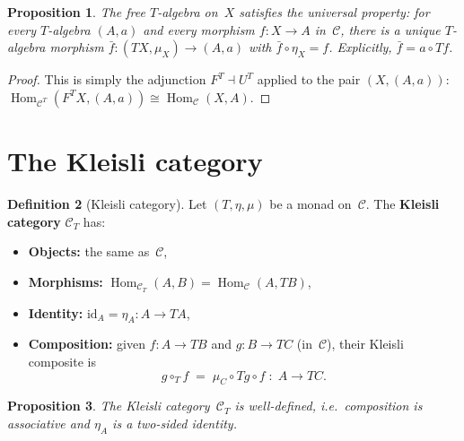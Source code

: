 \documentclass[a4paper,12pt]{book}
\DeclareMathOperator{\Hom}{Hom}
\newcommand{\id}{\mathrm{id}}
\theoremstyle{definition}
\newtheorem{definition}{Definition}[section]
\theoremstyle{plain}
\newtheorem{proposition}[definition]{Proposition}
\theoremstyle{remark}
\begin{document}
\begin{proposition}\label{prop:free-algebra-universal}
The free $T$-algebra on~$X$ satisfies the universal property:
for every $T$-algebra $(A,a)$ and every morphism $f\colon X\to A$
in~$\mathcal{C}$, there is a unique $T$-algebra morphism
$\bar{f}\colon(TX,\mu_X)\to(A,a)$ with $\bar{f}\circ\eta_X = f$.
Explicitly, $\bar{f} = a\circ Tf$.
\end{proposition}

\begin{proof}
This is simply the adjunction $F^T\dashv U^T$ applied to the pair
$(X,(A,a))$: $\Hom_{\mathcal{C}^T}(F^TX,(A,a))\cong\Hom_{\mathcal{C}}(X,A)$.
\end{proof}


\section{The Kleisli category}\label{sec:kleisli}

\begin{definition}[Kleisli category]\label{def:kleisli}
Let $(T,\eta,\mu)$ be a monad on~$\mathcal{C}$.
The \textbf{Kleisli category} $\mathcal{C}_T$ has:
\begin{itemize}
\item \textbf{Objects:} the same as~$\mathcal{C}$,
\item \textbf{Morphisms:} $\Hom_{\mathcal{C}_T}(A,B) = \Hom_{\mathcal{C}}(A,TB)$,
\item \textbf{Identity:} $\id_A = \eta_A\colon A\to TA$,
\item \textbf{Composition:} given $f\colon A\to TB$ and $g\colon B\to TC$
    (in~$\mathcal{C}$), their Kleisli composite is
    \[
        g\circ_T f \;=\; \mu_C\circ Tg\circ f \;\colon\; A\to TC.
    \]
\end{itemize}
\end{definition}

\begin{proposition}\label{prop:kleisli-category}
The Kleisli category~$\mathcal{C}_T$ is well-defined, i.e.\
composition is associative and $\eta_A$ is a two-sided identity.
\end{proposition}
\end{document}
